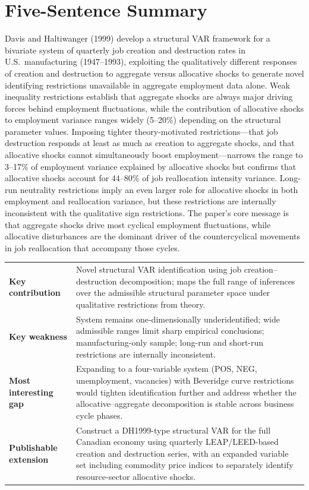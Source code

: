 \section*{Five-Sentence Summary}

Davis and Haltiwanger (1999) develop a structural VAR framework for a
bivariate system of quarterly job creation and destruction rates in U.S.\
manufacturing (1947--1993), exploiting the qualitatively different responses
of creation and destruction to aggregate versus allocative shocks to generate
novel identifying restrictions unavailable in aggregate employment data alone.
Weak inequality restrictions establish that aggregate shocks are always major
driving forces behind employment fluctuations, while the contribution of
allocative shocks to employment variance ranges widely (5--20\%) depending on
the structural parameter values. Imposing tighter theory-motivated
restrictions---that job destruction responds at least as much as creation to
aggregate shocks, and that allocative shocks cannot simultaneously boost
employment---narrows the range to 3--17\% of employment variance explained by
allocative shocks but confirms that allocative shocks account for 44--80\% of
job reallocation intensity variance. Long-run neutrality restrictions imply an
even larger role for allocative shocks in both employment and reallocation
variance, but these restrictions are internally inconsistent with the
qualitative sign restrictions. The paper's core message is that aggregate
shocks drive most cyclical employment fluctuations, while allocative
disturbances are the dominant driver of the countercyclical movements in job
reallocation that accompany those cycles.

\vspace{6pt}
\begin{quickref}
\begin{tabularx}{\linewidth}{@{}lX@{}}
\textbf{Key contribution} &
  Novel structural VAR identification using job creation--destruction
  decomposition; maps the full range of inferences over the admissible
  structural parameter space under qualitative restrictions from theory. \\[4pt]
\textbf{Key weakness} &
  System remains one-dimensionally underidentified; wide admissible ranges
  limit sharp empirical conclusions; manufacturing-only sample; long-run
  and short-run restrictions are internally inconsistent. \\[4pt]
\textbf{Most interesting gap} &
  Expanding to a four-variable system (POS, NEG, unemployment, vacancies)
  with Beveridge curve restrictions would tighten identification further and
  address whether the allocative--aggregate decomposition is stable across
  business cycle phases. \\[4pt]
\textbf{Publishable extension} &
  Construct a DH1999-type structural VAR for the full Canadian economy using
  quarterly LEAP/LEED-based creation and destruction series, with an expanded
  variable set including commodity price indices to separately identify
  resource-sector allocative shocks.
\end{tabularx}
\end{quickref}

